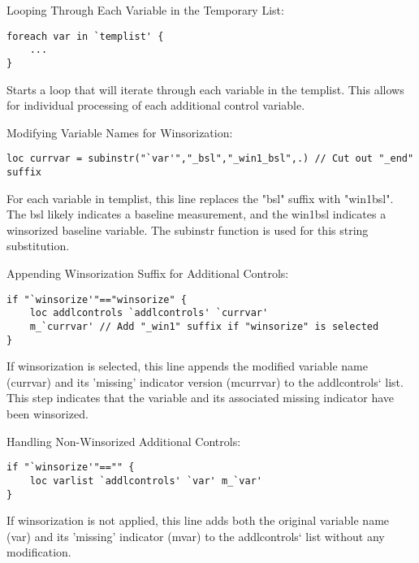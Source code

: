 \documentclass{article}
\begin{document}
Looping Through Each Variable in the Temporary List:
\begin{mdframed}
\begin{verbatim}
foreach var in `templist' {
    ...
}
\end{verbatim}
\end{mdframed}


Starts a loop that will iterate through each variable in the templist. This allows for individual processing of each additional control variable.\newline

Modifying Variable Names for Winsorization:
\begin{mdframed}
\begin{verbatim}
loc currvar = subinstr("`var'","_bsl","_win1_bsl",.) // Cut out "_end" suffix
\end{verbatim}
\end{mdframed}

For each variable in templist, this line replaces the "bsl" suffix with "win1bsl". The bsl likely indicates a baseline measurement, and the win1bsl indicates a winsorized baseline variable. The subinstr function is used for this string substitution. \newline

Appending Winsorization Suffix for Additional Controls:

\begin{mdframed}
\begin{verbatim}
if "`winsorize'"=="winsorize" {
    loc addlcontrols `addlcontrols' `currvar' 
    m_`currvar' // Add "_win1" suffix if "winsorize" is selected
}
\end{verbatim}
\end{mdframed}




If winsorization is selected, this line appends the modified variable name (currvar) and its 'missing' indicator version (mcurrvar) to the addlcontrols` list. This step indicates that the variable and its associated missing indicator have been winsorized. \newline

Handling Non-Winsorized Additional Controls:
\begin{mdframed}
\begin{verbatim}
if "`winsorize'"=="" {
    loc varlist `addlcontrols' `var' m_`var'
}
\end{verbatim}
\end{mdframed}

If winsorization is not applied, this line adds both the original variable name (var) and its 'missing' indicator (mvar) to the addlcontrols` list without any modification. \newline
\end{document}
